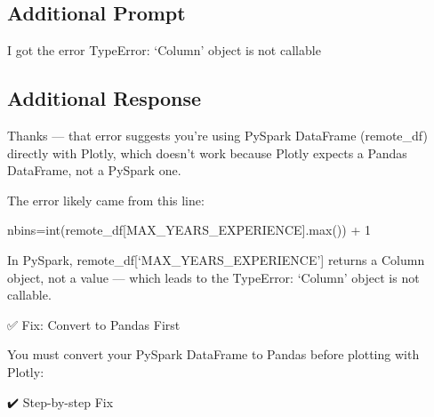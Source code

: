 \documentclass[
  letterpaper,
  DIV=11,
  numbers=noendperiod]{scrartcl}
\newenvironment{Shaded}{\begin{snugshade}}{\end{snugshade}}
\newcommand{\BuiltInTok}[1]{\textcolor[rgb]{0.00,0.23,0.31}{#1}}
\newcommand{\DecValTok}[1]{\textcolor[rgb]{0.68,0.00,0.00}{#1}}
\newcommand{\NormalTok}[1]{\textcolor[rgb]{0.00,0.23,0.31}{#1}}
\newcommand{\OperatorTok}[1]{\textcolor[rgb]{0.37,0.37,0.37}{#1}}
\newcommand{\StringTok}[1]{\textcolor[rgb]{0.13,0.47,0.30}{#1}}
\begin{document}
\subsection{Additional Prompt}\label{additional-prompt-3}

I got the error TypeError: `Column' object is not callable

\subsection{Additional Response}\label{additional-response-2}

Thanks --- that error suggests you're using PySpark DataFrame
(remote\_df) directly with Plotly, which doesn't work because Plotly
expects a Pandas DataFrame, not a PySpark one.

The error likely came from this line:

\begin{Shaded}
\begin{Highlighting}[]
\NormalTok{nbins}\OperatorTok{=}\BuiltInTok{int}\NormalTok{(remote\_df[}\StringTok{\textquotesingle{}MAX\_YEARS\_EXPERIENCE\textquotesingle{}}\NormalTok{].}\BuiltInTok{max}\NormalTok{()) }\OperatorTok{+} \DecValTok{1}
\end{Highlighting}
\end{Shaded}

In PySpark, remote\_df{[}`MAX\_YEARS\_EXPERIENCE'{]} returns a Column
object, not a value --- which leads to the TypeError: `Column' object is
not callable.

✅ Fix: Convert to Pandas First

You must convert your PySpark DataFrame to Pandas before plotting with
Plotly:

✔️ Step-by-step Fix
\end{document}
